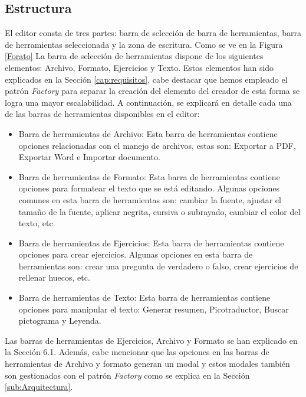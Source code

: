 \subsection{Estructura}
El editor consta de tres partes: barra de selección de barra de herramientas, barra de herramientas seleccionada y la zona de escritura. Como se ve en la Figura \ref{Forato}
La barra de selección de herramientas dispone de los siguientes elementos: Archivo, Formato, Ejercicios y Texto. Estos elementos han sido explicados en la Sección \ref{cap:requisitos}, cabe destacar que hemos empleado el patrón \textit{Factory} para separar la creación del elemento del creador de esta forma se logra una mayor escalabilidad.
A continuación, se explicará en detalle cada una de las barras de herramientas disponibles en el editor:
\begin{itemize}
  \item Barra de herramientas de Archivo: Esta barra de herramientas contiene opciones relacionadas con el manejo de archivos, estas son: Exportar a PDF, Exportar Word e Importar documento.
  \item Barra de herramientas de Formato: Esta barra de herramientas contiene opciones para formatear el texto que se está editando. Algunas opciones comunes en esta barra de herramientas son: cambiar la fuente, ajustar el tamaño de la fuente, aplicar negrita, cursiva o subrayado, cambiar el color del texto, etc.
  \item Barra de herramientas de Ejercicios: Esta barra de herramientas contiene opciones para crear ejercicios. Algunas opciones en esta barra de herramientas son: crear una pregunta de verdadero o falso, crear ejercicios de rellenar huecos, etc.
  \item Barra de herramientas de Texto: Esta barra de herramientas contiene opciones para manipular el texto:  Generar resumen, Picotraductor, Buscar pictograma y Leyenda.
\end{itemize}
Las barras de herramientas de Ejercicios, Archivo y Formato se han explicado en la Sección 6.1. Además, cabe mencionar que las opciones en las barras de herramientas de Archivo y formato generan un modal y estos modales también son gestionados con el patrón \textit{Factory} como se explica en la Sección \ref{sub:Arquitectura}.

